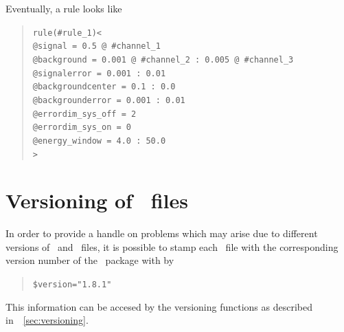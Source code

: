 Eventually, a rule looks like
\begin{quote}
{\tt rule(\#rule\_1)<\\
\tb @signal = 0.5 @ \#channel\_1\\
\tb @background = 0.001 @ \#channel\_2 :  0.005 @ \#channel\_3\\
\tb @signalerror =       0.001  :       0.01\\
\tb @backgroundcenter =  0.1 :       0.0\\
\tb @backgrounderror =   0.001 :       0.01\\
\tb @errordim\_sys\_off = 2\\
\tb @errordim\_sys\_on = 0\\
\tb @energy\_window = 4.0 : 50.0\\ 
>}
\end{quote}

\section{Versioning of \AEDL\ files}
\label{sec:aedl_versioning}

In order to provide a handle on problems which may arise due to different
versions of \GLOBES\ and \AEDL\ files, it is possible to stamp each 
\AEDL\ file with the corresponding version number of the \GLOBES\ package with
 by
\begin{quote}
{\tt \$version="1.8.1"}
\end{quote}
This information can be accesed by the versioning functions as described in~\Sec~\ref{sec:versioning}.



